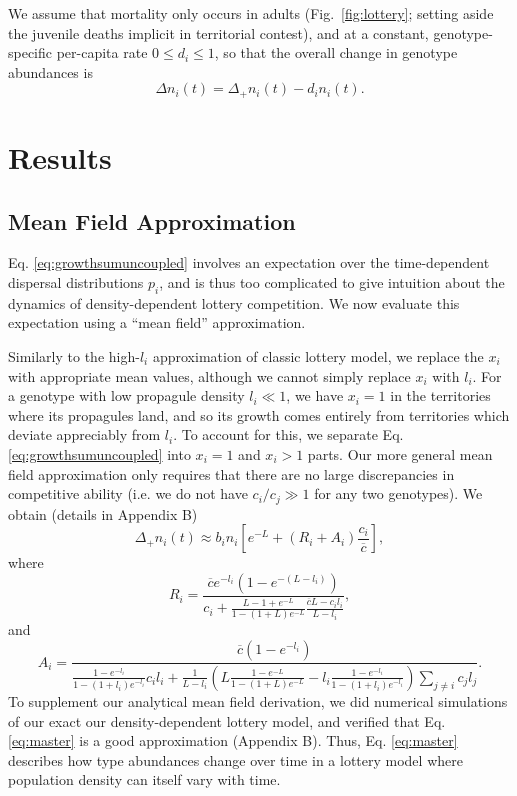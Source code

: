 \documentclass[11pt]{article}
\begin{document}
We assume that mortality only occurs in adults (Fig.~\ref{fig:lottery}; setting aside the juvenile deaths implicit in territorial contest), and at a constant, genotype-specific per-capita rate $0\leq d_i\leq 1$, so that the overall change in genotype abundances is
\begin{equation}
\Delta n_i(t)=\Delta_+ n_i(t)-d_i n_i(t). \label{eq:delttot}
\end{equation}

\section*{Results}

\subsection*{Mean Field Approximation}

Eq. \eqref{eq:growthsumuncoupled} involves an expectation over the time-dependent dispersal distributions $p_i$, and is thus too complicated to give intuition about the dynamics of density-dependent lottery competition. We now evaluate this expectation using a ``mean field'' approximation. 

Similarly to the high-$l_i$ approximation of classic lottery model, we replace the $x_i$ with appropriate mean values, although we cannot simply replace $x_i$ with $l_i$. For a genotype with low propagule density $l_i\ll 1$, we have $x_i=1$ in the territories where its propagules land, and so its growth comes entirely from territories which deviate appreciably from $l_i$. To account for this, we separate Eq. \eqref{eq:growthsumuncoupled} into $x_i=1$ and $x_i>1$ parts. Our more general mean field approximation only requires that there are no large discrepancies in competitive ability (i.e. we do not have $c_i/c_j\gg 1$ for any two genotypes). We obtain (details in Appendix B)
\begin{equation}
\Delta_+ n_i(t)\approx b_i n_i\left[e^{-L}+(R_i+A_i)\frac{c_i}{\overline{c}}\right], \label{eq:master}
\end{equation}
where
\begin{equation}
R_i=\frac{\overline{c}e^{-l_i}(1-e^{-(L-l_i)})}{c_i +\frac{L-1+e^{-L}}{1-(1+L)e^{-L}}\frac{\overline{c}L- c_il_i}{L-l_i}},\label{eq:Dr}
\end{equation}
and
\begin{equation}
A_i=\frac{\overline{c}(1-e^{-l_i})}{\frac{1-e^{-l_i}}{1-(1+l_i)e^{-l_i}}c_il_i+\frac{1}{L-l_i}\left(L\frac{1-e^{-L}}{1-(1+L)e^{-L}}-l_i\frac{1-e^{-l_i}}{1-(1+l_i)e^{-l_i}}\right)\sum_{j\neq i}c_jl_j}.\label{eq:Da}
\end{equation}
To supplement our analytical mean field derivation, we did numerical simulations of our exact our density-dependent lottery model, and verified  that Eq. \eqref{eq:master} is a good approximation (Appendix B). Thus, Eq. \eqref{eq:master} describes how type abundances change over time in a lottery model where population density can itself vary with time.
\end{document}
